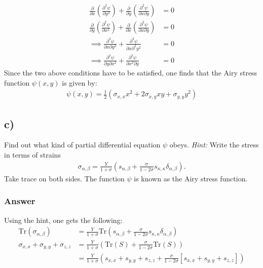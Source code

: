 \documentclass{article}
\newcommand{\trace}{\text{Tr}}
\begin{document}
\begin{align*}
    \frac{\partial}{\partial x}\left(\frac{\partial^2\psi}{\partial y^2}\right) + \frac{\partial}{\partial y}\left(\frac{\partial^2\psi}{\partial x\partial y}\right) &= 0\\
    \frac{\partial}{\partial y}\left(\frac{\partial^2\psi}{\partial x^2}\right) + \frac{\partial}{\partial x}\left(\frac{\partial^2\psi}{\partial x\partial y}\right) &= 0\\
    \implies \frac{\partial^3\psi}{\partial x\partial y^2} +\frac{\partial^3\psi}{\partial x\partial^2 y^2} &= 0\\
    \implies \frac{\partial^3\psi}{\partial y\partial x^2} + \frac{\partial^3\psi}{\partial x^2\partial y} &= 0
\end{align*}Since the two above conditions have to be satisfied, one finds that the Airy stress function $\psi(x,y)$ is given by:
\begin{align*}
    \psi(x,y) = \frac{1}{2}\left(\sigma_{x,x}x^2 + 2\sigma_{x,y}xy + \sigma_{y,y}y^2\right)
\end{align*}


\subsection*{c)}
Find out what kind of partial differential equation $\psi$ obeys. \textit{Hint:} Write the stress in terms of strains
\begin{align*}
    \sigma_{\alpha, \beta} = \frac{Y}{1+\sigma}\left(s_{\alpha,\beta} + \frac{\sigma}{1-2\sigma}s_{\kappa, \kappa}\delta_{\alpha,\beta}\right).
\end{align*}Take trace on both sides. The function $\psi$ is known as the Airy stress function.

\subsubsection*{Answer}
Using the hint, one gets the following:
\begin{align*}
    \trace\left(\sigma_{\alpha, \beta}\right) &= \frac{Y}{1+\sigma}\trace\left(s_{\alpha,\beta} + \frac{\sigma}{1-2\sigma}s_{\kappa, \kappa}\delta_{\alpha,\beta}\right)\\
    \sigma_{x,x} + \sigma_{y,y} + \sigma_{z,z} &= \frac{Y}{1+\sigma}\left(\trace(S) + \frac{\sigma}{1-2\sigma}\trace(S)\right)\\
    &=\frac{Y}{1+\sigma}\left(s_{x,x} + s_{y,y} + s_{z,z} + \frac{\sigma}{1-2\sigma}\left[s_{x,x} + s_{y,y} + s_{z,z}\right]\right)
\end{align*}
\end{document}
